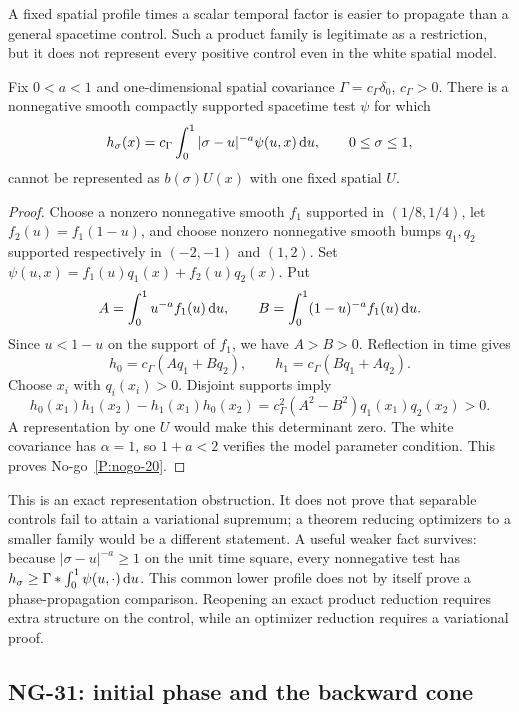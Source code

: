 A fixed spatial profile times a scalar temporal factor is easier to
propagate than a general spacetime control. Such a product family is
legitimate as a restriction, but it does not represent every positive
control even in the white spatial model.

\setcounter{nogo}{19}
\begin{nogo}
  \label{P:nogo-20}
  Fix $0<a<1$ and one-dimensional spatial covariance
  $\Gamma=c_\Gamma\delta_0$, $c_\Gamma>0$. There is a nonnegative smooth
  compactly supported spacetime test $\psi$ for which
  \[
    h_\sigma(x)=c_\Gamma\int_0^1|\sigma-u|^{-a}\psi(u,x)\,\mathrm{d} u,
    \qquad 0\le\sigma\le1,
  \]
  cannot be represented as $b(\sigma)U(x)$ with one fixed spatial $U$.
\end{nogo}
\begin{proof}
  Choose a nonzero nonnegative smooth $f_1$ supported in $(1/8,1/4)$,
  let $f_2(u)=f_1(1-u)$, and choose nonzero nonnegative smooth bumps
  $q_1,q_2$ supported respectively in $(-2,-1)$ and $(1,2)$. Set
  $\psi(u,x)=f_1(u)q_1(x)+f_2(u)q_2(x)$. Put
  \[
    A=\int_0^1u^{-a}f_1(u)\,\mathrm{d} u,\qquad
    B=\int_0^1(1-u)^{-a}f_1(u)\,\mathrm{d} u.
  \]
  Since $u<1-u$ on the support of $f_1$, we have $A>B>0$.
  Reflection in time gives
  \[
    h_0=c_\Gamma(Aq_1+Bq_2),\qquad
    h_1=c_\Gamma(Bq_1+Aq_2).
  \]
  Choose $x_i$ with $q_i(x_i)>0$. Disjoint supports imply
  \[
    h_0(x_1)h_1(x_2)-h_1(x_1)h_0(x_2)
    =c_\Gamma^2(A^2-B^2)q_1(x_1)q_2(x_2)>0.
  \]
  A representation by one $U$ would make this determinant zero.
  The white covariance has $\alpha=1$, so $1+a<2$ verifies the model
  parameter condition. This proves No-go~\ref{P:nogo-20}.
\end{proof}

This is an exact representation obstruction. It does not prove that
separable controls fail to attain a variational supremum; a theorem
reducing optimizers to a smaller family would be a different statement.
A useful weaker fact survives: because $|\sigma-u|^{-a}\ge1$ on the
unit time square, every nonnegative test has
$h_\sigma\ge\Gamma*\int_0^1\psi(u,\cdot)\,\mathrm{d} u$.
This common lower profile does not by itself prove a phase-propagation
comparison. Reopening an exact product reduction requires extra structure
on the control, while an optimizer reduction requires a variational proof.

\subsection{NG-31: initial phase and the backward cone}\label{S:nogo-31}

